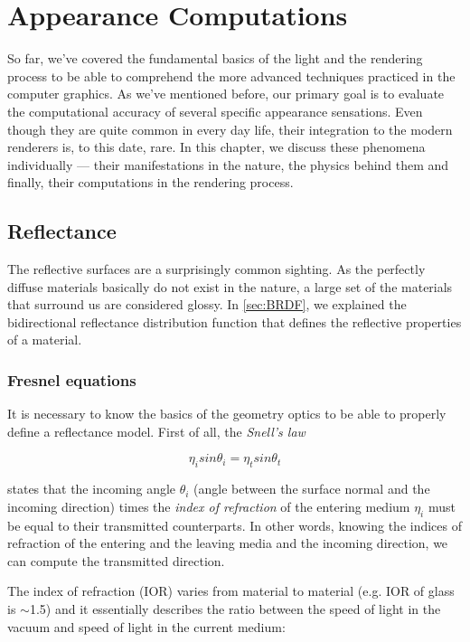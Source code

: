 \chapter{Appearance Computations}
\label{chap:appearance}

So far, we've covered the fundamental basics of the light and the rendering process to be able to comprehend the more advanced techniques practiced in the computer graphics. As we've mentioned before, our primary goal is to evaluate the computational accuracy of several specific appearance sensations. Even though they are quite common in every day life, their integration to the modern renderers is, to this date, rare.  In this chapter, we discuss these phenomena individually --- their manifestations in the nature, the physics behind them and finally, their computations in the rendering process. 

\section{Reflectance}

The reflective surfaces are a surprisingly common sighting. As the perfectly diffuse materials basically do not exist in the nature, a large set of the materials that surround us are considered glossy. In \autoref{sec:BRDF}, we explained the bidirectional reflectance distribution function that defines the reflective properties of a material. 

\subsection{Fresnel equations}

It is necessary to know the basics of the geometry optics to be able to properly define a reflectance model. First of all, the \emph{Snell's law}~\cite{pharr2016physically}

\begin{equation}
\eta_i sin\theta_i = \eta_t sin\theta_t 
\end{equation}

states that the incoming angle $\theta_i$ (angle between the surface normal and the incoming direction) times the \emph{index of refraction} of the entering medium $\eta_i$ must be equal to their transmitted counterparts. In other words, knowing the indices of refraction of the entering and the leaving media and the incoming direction, we can compute the transmitted direction.

The index of refraction (IOR) varies from material to material (e.g. IOR of glass is $\sim$1.5) and it essentially describes the ratio between the speed of light in the vacuum and speed of light in the current medium: 

